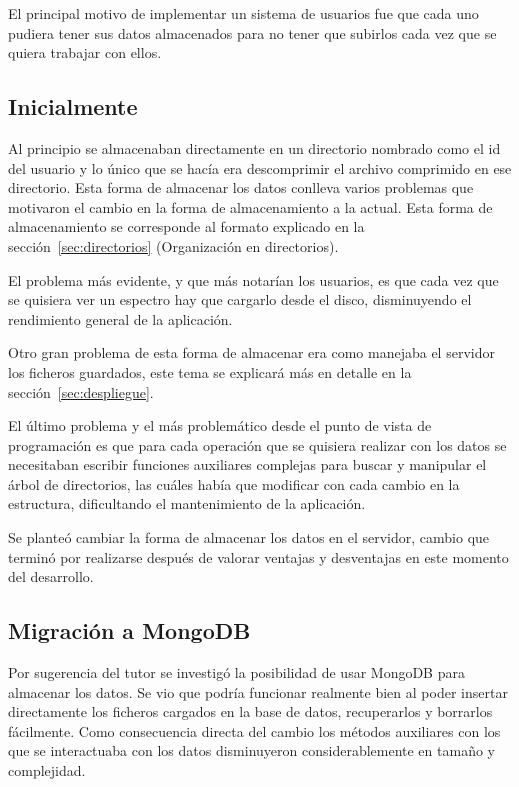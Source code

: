 El principal motivo de implementar un sistema de usuarios fue que cada uno
pudiera tener sus datos almacenados para no tener que subirlos cada vez que se
quiera trabajar con ellos.

\subsection{Inicialmente}

Al principio se almacenaban directamente en un directorio nombrado como el id
del usuario y lo único que se hacía era descomprimir el archivo comprimido en
ese directorio. Esta forma de almacenar los datos conlleva varios problemas que
motivaron el cambio en la forma de almacenamiento a la actual. Esta forma de
almacenamiento se corresponde al formato explicado en la
sección~\ref{sec:directorios} (Organización en directorios).

El problema más evidente, y que más notarían los usuarios, es que cada vez que
se quisiera ver un espectro hay que cargarlo desde el disco, disminuyendo el
rendimiento general de la aplicación.

Otro gran problema de esta forma de almacenar era como manejaba el servidor los
ficheros guardados, este tema se explicará más en detalle en la
sección~\ref{sec:despliegue}.

El último problema y el más problemático desde el punto de vista de programación
es que para cada operación que se quisiera realizar con los datos se necesitaban
escribir funciones auxiliares complejas para buscar y manipular el árbol de
directorios, las cuáles había que modificar con cada cambio en la estructura,
dificultando el mantenimiento de la aplicación.

Se planteó cambiar la forma de almacenar los datos en el servidor, cambio que
terminó por realizarse después de valorar ventajas y desventajas en este momento
del desarrollo.

\subsection{Migración a MongoDB}

Por sugerencia del tutor se investigó la posibilidad de usar MongoDB para
almacenar los datos. Se vio que podría funcionar realmente bien al poder
insertar directamente los ficheros cargados en la base de datos, recuperarlos y
borrarlos fácilmente. Como consecuencia directa del cambio los métodos
auxiliares con los que se interactuaba con los datos disminuyeron
considerablemente en tamaño y complejidad.

